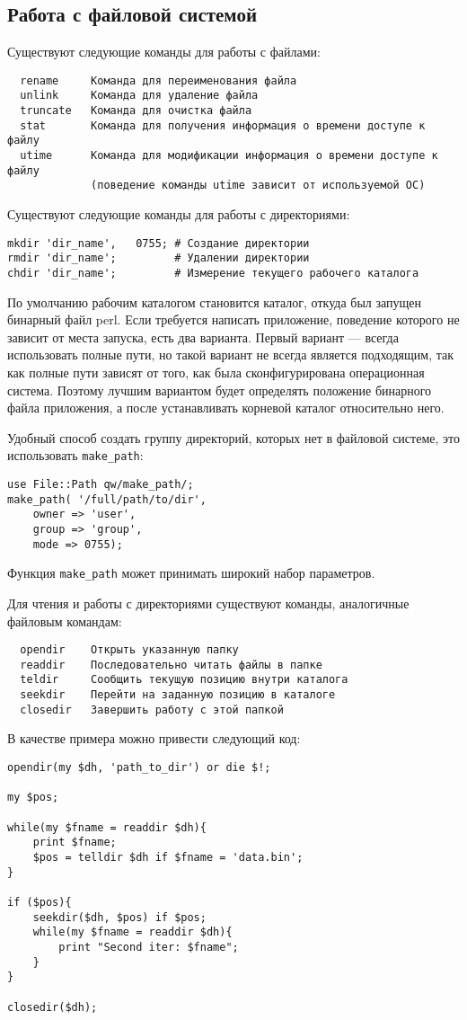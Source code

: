 \subsection{Работа с файловой системой}
Существуют следующие команды для работы с файлами:
\begin{verbatim}
  rename     Команда для переименования файла
  unlink     Команда для удаление файла
  truncate   Команда для очистка файла
  stat       Команда для получения информация о времени доступе к файлу
  utime      Команда для модификации информация о времени доступе к файлу
             (поведение команды utime зависит от используемой ОС)
\end{verbatim}

Существуют следующие команды для работы с директориями:
\begin{verbatim}
mkdir 'dir_name',   0755; # Создание директории
rmdir 'dir_name';         # Удалении директории
chdir 'dir_name';         # Измерение текущего рабочего каталога
\end{verbatim}
По умолчанию рабочим каталогом становится каталог, откуда был запущен бинарный файл perl. Если требуется написать приложение, поведение которого не зависит от места запуска, есть два варианта. Первый вариант --- всегда использовать полные пути, но такой вариант не всегда является подходящим, так как полные пути зависят от того, как была сконфигурирована операционная система. Поэтому лучшим вариантом будет определять положение бинарного файла приложения, а после устанавливать корневой каталог относительно него.

Удобный способ создать группу директорий, которых нет в файловой системе, это использовать \verb|make_path|:
\begin{verbatim}
use File::Path qw/make_path/;
make_path( '/full/path/to/dir',
    owner => 'user',
    group => 'group',
    mode => 0755);
\end{verbatim}
Функция \verb|make_path| может принимать широкий набор параметров.

Для чтения и работы с директориями существуют команды, аналогичные файловым командам:
\begin{verbatim}
  opendir    Открыть указанную папку
  readdir    Последовательно читать файлы в папке
  teldir     Сообщить текущую позицию внутри каталога
  seekdir    Перейти на заданную позицию в каталоге
  closedir   Завершить работу с этой папкой
\end{verbatim}
В качестве примера можно привести следующий код:
\begin{verbatim}
opendir(my $dh, 'path_to_dir') or die $!;

my $pos;

while(my $fname = readdir $dh){
    print $fname;
    $pos = telldir $dh if $fname = 'data.bin';
}

if ($pos){
    seekdir($dh, $pos) if $pos;
    while(my $fname = readdir $dh){
        print "Second iter: $fname";
    }
}

closedir($dh);
\end{verbatim}


